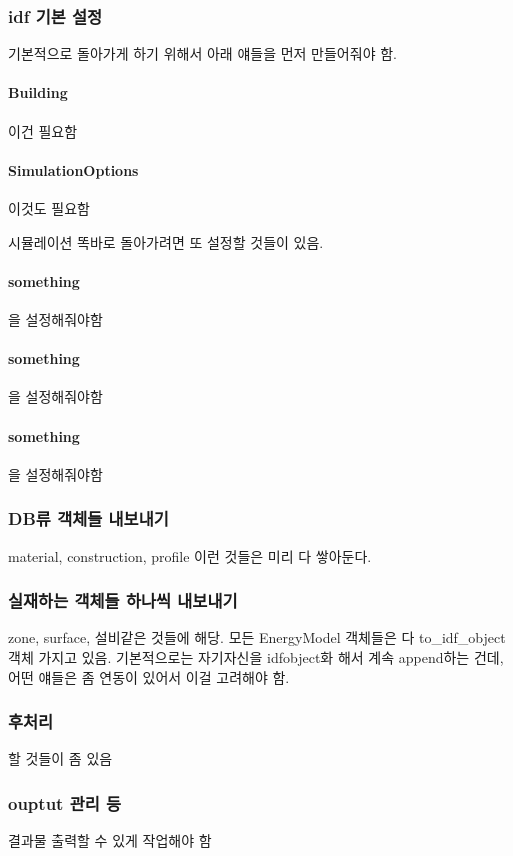 \subsubsection{idf 기본 설정}
기본적으로 돌아가게 하기 위해서 아래 얘들을 먼저 만들어줘야 함.
\paragraph{Building} 이건 필요함
\paragraph{SimulationOptions} 이것도 필요함

시뮬레이션 똑바로 돌아가려면 또 설정할 것들이 있음.
\paragraph{something} 을 설정해줘야함
\paragraph{something} 을 설정해줘야함
\paragraph{something} 을 설정해줘야함

\subsubsection{DB류 객체들 내보내기}
material, construction, profile 이런 것들은 미리 다 쌓아둔다.

\subsubsection{실재하는 객체들 하나씩 내보내기}
zone, surface, 설비같은 것들에 해당. 모든 EnergyModel 객체들은 다 to\_idf\_object 객체 가지고 있음. 기본적으로는 자기자신을 idfobject화 해서 계속 append하는 건데, 어떤 얘들은 좀 연동이 있어서 이걸 고려해야 함.

\subsubsection{후처리}
할 것들이 좀 있음

\subsubsection{ouptut 관리 등}
결과물 출력할 수 있게 작업해야 함


